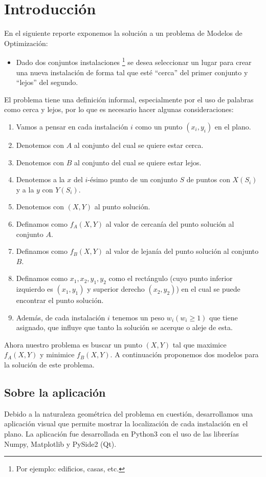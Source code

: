\section{Introducción}

En el siguiente reporte exponemos la solución a un problema de Modelos de Optimización:

\begin{itemize}[label=\textbullet]
    \item Dado dos conjuntos instalaciones \footnote{Por ejemplo: edificios, casas, etc.} se desea seleccionar un lugar para crear una nueva instalación de forma tal que esté ``cerca'' del primer conjunto y ``lejos'' del segundo.
\end{itemize}

El problema tiene una definición informal, especialmente por el uso de palabras como cerca y lejos, por lo que es necesario hacer algunas consideraciones:

\begin{enumerate}
    \item Vamos a pensar en cada instalación $i$ como un punto $(x_i, y_i)$ en el plano.
    \item Denotemos con $A$ al conjunto del cual se quiere estar cerca.
    \item Denotemos con $B$ al conjunto del cual se quiere estar lejos.
    \item Denotemos a la $x$ del $i$-ésimo punto de un conjunto $S$ de puntos con $X(S_i)$ y a la $y$ con $Y(S_i)$.
    \item Denotemos con $(X, Y)$ al punto solución.
    \item Definamos como $f_A(X, Y)$ al valor de cercanía del punto solución al conjunto $A$.
    \item Definamos como $f_B(X, Y)$ al valor de lejanía del punto solución al conjunto $B$.
    \item Definamos como $x_1, x_2, y_1, y_2$ como el rectángulo (cuyo punto inferior izquierdo es $(x_1, y_1)$ y superior derecho $(x_2, y_2)$) en el cual se puede encontrar el punto solución.
    \item Además, de cada instalación $i$ tenemos un peso $w_i (w_i \ge 1)$ que tiene asignado, que influye que tanto la solución se acerque o aleje de esta.
\end{enumerate}

Ahora nuestro problema es buscar un punto $(X, Y)$ tal que maximice $f_A(X, Y)$ y minimice $f_B(X, Y)$. A continuación proponemos dos modelos para la solución de este problema.

\subsection{Sobre la aplicación}

Debido a la naturaleza geométrica del problema en cuestión, desarrollamos una aplicación visual que permite mostrar la localización de cada instalación en el plano. La aplicación fue desarrollada en Python3 con el uso de las librerías Numpy, Matplotlib y PySide2 (Qt).
